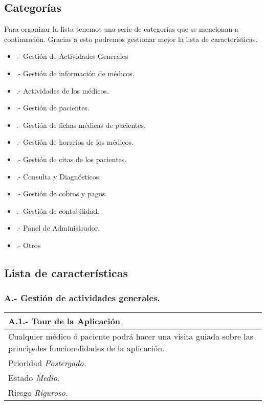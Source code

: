 \documentclass[a4paper,oneside,11pt]{book}
\begin{document}
\subsection{Categorías}
Para organizar la lista tenemos una serie de categorías que se mencionan a continuación. Gracias a esto podremos gestionar mejor la lista de características.
\begin{itemize}
\item [A].- Gestión de Actividades Generales 
\item [B].- Gestión de información de médicos.
\item [C].- Actividades de los médicos.
\item [D].- Gestión de pacientes.
\item [E].- Gestión de fichas médicas de pacientes.
\item [F].- Gestión de horarios de los médicos.
\item [G].- Gestión de citas de los pacientes.
\item [H].- Consulta y Diagnósticos.
\item [I].- Gestión de cobros y pagos.
\item [J].- Gestión de contabilidad.
\item [K].- Panel de Administrador.
\item [L].- Otros
\end{itemize}

\subsection{Lista de características}

\subsubsection{A.- Gestión de actividades generales.}

\begin{center}
\begin{tabulary}{15cm}{|L|}
	\hline
		\bf{A.1.- Tour de la Aplicación} \\
	\hline
		Cualquier médico ó paciente podrá hacer una visita guiada sobre las principales funcionalidades de la aplicación.\\
	\hline
		Prioridad \textit{Postergado.} \\
	\hline
		Estado \textit{Medio.} \\
	\hline
		Riesgo \textit{Riguroso.} \\
	\hline
\end{tabulary}
\end{center}
\end{document}
